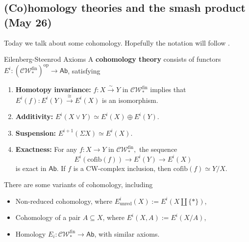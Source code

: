 \subsection{(Co)homology theories and the smash product (May 26)}
Today we talk about some cohomology. Hopefully the notation will follow \cite{may}.
\begin{namedthm}{Eilenberg-Steenrod Axioms} 
    A \textbf{cohomology theory} consists of functors  $E^i \colon (\mathcal{CW} _*^{\mathrm{fin}})^{\mathrm{op}} \to \mathsf{Ab} $, satisfying
    \begin{enumerate}[label=(\roman*)]
    \setlength\itemsep{-.2em}
\item \textbf{Homotopy invariance:} $f \colon X \xrightarrow{\sim} Y$ in $\mathcal{CW} _*^{\mathrm{fin}}$ implies that $E^i  (f)  \colon E^i (Y) \xrightarrow{\cong} E^i (X)$ is an isomorphism.
\item \textbf{Additivity:} $E^i (X \vee Y) \simeq  E^i  (X)\oplus E^i (Y)$.
\item \textbf{Suspension:} $E^{i+1}(\Sigma X) \simeq  E^i (X)$.
\item \textbf{Exactness:} For any  $f \colon X \to Y$ in $\mathcal{CW} _* ^{\mathrm{fin}},$ the sequence \[
        E^i ( \mathrm{cofib}(f)) \to E^i  (Y) \to  E^i (X)
    \] is exact in $\mathsf{Ab} $. If $f$ is a CW-complex inclusion, then $\mathrm{cofib}(f) \simeq  Y /X.$
    \end{enumerate}
\end{namedthm}
There are some variants of cohomology, including
\begin{itemize}
\setlength\itemsep{-.2em}
    \item Non-reduced cohomology, where $E^i  _{\mathrm{unred}}(X):= E^i (X \amalg \{*\} )$,
    \item Cohomology of a pair $A \subseteq X$, where $E^i (X,A):=E ^i (X /A)$,
    \item Homology $E_i \colon \mathcal{CW} _* ^{\mathrm{fin}} \to \mathsf{Ab} $, with similar axioms.
\end{itemize}
